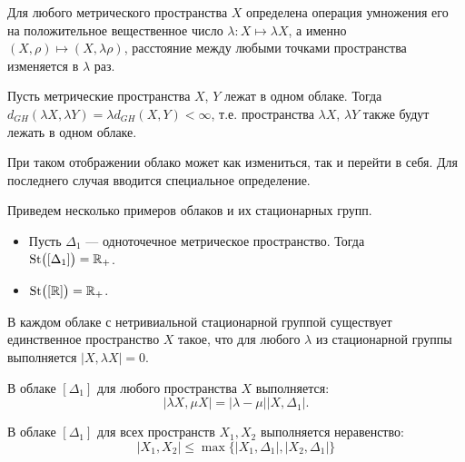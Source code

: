  	 Для любого метрического пространства $X$ определена операция умножения его
на положительное вещественное число $\lambda\colon X\mapsto \lambda X$, а именно
$(X, \rho) \mapsto (X, \lambda \rho)$, расстояние между любыми точками
пространства изменяется в $\lambda$ раз.
\begin{remark} Пусть метрические
пространства $X$, $Y$ лежат в одном облаке. Тогда
$d_{GH}(\lambda X, \lambda Y) = \lambda d_{GH}(X,Y) < \infty$, т.е. пространства
$\lambda X$, $\lambda Y$ также будут лежать в одном облаке.
\label{remOneCloud}
\end{remark}
  При таком отображении облако может как
измениться, так и перейти в себя. Для последнего случая вводится специальное
определение.

Приведем несколько примеров облаков и их стационарных групп.
 	 
\begin{itemize}
  \item Пусть $\Delta_1$ --- одноточечное метрическое
        пространство.  Тогда\\ $\operatorname{St}\bigl([\Delta_1]\bigr) = \mathbb{R}_+$.
  \item $\operatorname{St}\bigl([\mathbb{R}]\bigr) = \mathbb{R}_+ $.
\end{itemize}
\begin{lemma}
    \cite{TuzhBog2}В каждом облаке с нетривиальной стационарной группой существует единственное
    пространство $X$ такое, что для любого $\lambda$ из стационарной группы
    выполняется $|X,\lambda X| = 0$.
\label{centerLemma}
\end{lemma}
\begin{remark} В
облаке $[\Delta_1]$ для любого пространства $X$ выполняется:
	$$|\lambda X, \mu X| = |\lambda - \mu||X,\Delta_1|.$$
 \end{remark} \begin{remark} В облаке
$[\Delta_{1}]$ для всех пространств $X_{1}, X_{2}$ выполняется неравенство:
   $$|X_{1},X_{2}| \le \max\{|X_{1}, \Delta_{1}|,|X_{2},\Delta_{1}|\}$$
\label{remUltraMetric}
 \end{remark}
